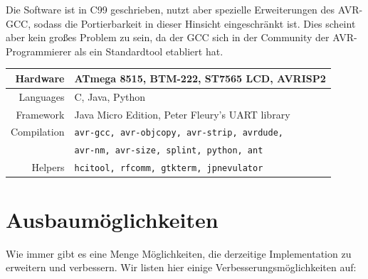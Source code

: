 \documentclass[ngerman]{article}
\begin{document}
Die Software ist in C99 geschrieben, nutzt aber spezielle Erweiterungen des
AVR-GCC, sodass die Portierbarkeit in dieser Hinsicht eingeschränkt ist. Dies
scheint aber kein großes Problem zu sein, da der GCC sich in der Community der
AVR-Programmierer als ein Standardtool etabliert hat.

    \begin{tabular}{|r||l|}
        \hline
        Hardware & ATmega 8515, BTM-222, ST7565 LCD, AVRISP2 \\
        \hline
        Languages & C, Java, Python\\
        \hline
        Framework & Java Micro Edition, Peter Fleury's UART library\\
        \hline
        Compilation & {\tt avr-gcc, avr-objcopy, avr-strip, avrdude,} \\
                    & {\tt avr-nm, avr-size, splint, python, ant} \\
        \hline
        Helpers & {\tt hcitool, rfcomm, gtkterm, jpnevulator} \\
        \hline
    \end{tabular}



\section{Ausbaumöglichkeiten}

Wie immer gibt es eine Menge Möglichkeiten, die derzeitige Implementation zu
erweitern und verbessern. Wir listen hier einige Verbesserungsmöglichkeiten
auf:
\end{document}

